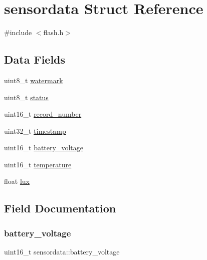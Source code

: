 \hypertarget{structsensordata}{}\section{sensordata Struct Reference}
\label{structsensordata}


{\ttfamily \#include $<$flash.\+h$>$}

\subsection*{Data Fields}
\begin{DoxyCompactItemize}
\item 
uint8\+\_\+t \hyperlink{structsensordata_a9cb15bd3d69e52566390457ffd51ef9c}{watermark}
\item 
uint8\+\_\+t \hyperlink{structsensordata_aef94847a8fec3bf03c05ed7b102a1651}{status}
\item 
uint16\+\_\+t \hyperlink{structsensordata_af5b5fc72642bf7ac7141c792617088b8}{record\+\_\+number}
\item 
uint32\+\_\+t \hyperlink{structsensordata_adf8788ae3f9d0b0f83288934aeda5cb6}{timestamp}
\item 
uint16\+\_\+t \hyperlink{structsensordata_aa8d0ea2f040e1323c5cea7e525ad4fa7}{battery\+\_\+voltage}
\item 
uint16\+\_\+t \hyperlink{structsensordata_a4a11bc3baaf9f77353bad41d256161fa}{temperature}
\item 
float \hyperlink{structsensordata_a2ea254077a9f7545974a7a3ef51fc799}{lux}
\end{DoxyCompactItemize}


\subsection{Field Documentation}
\mbox{\label{structsensordata_aa8d0ea2f040e1323c5cea7e525ad4fa7}} 
\subsubsection{\texorpdfstring{battery\+\_\+voltage}{battery\_voltage}}
{\footnotesize\ttfamily uint16\+\_\+t sensordata\+::battery\+\_\+voltage}

\mbox{\label{structsensordata_a2ea254077a9f7545974a7a3ef51fc799}} 
